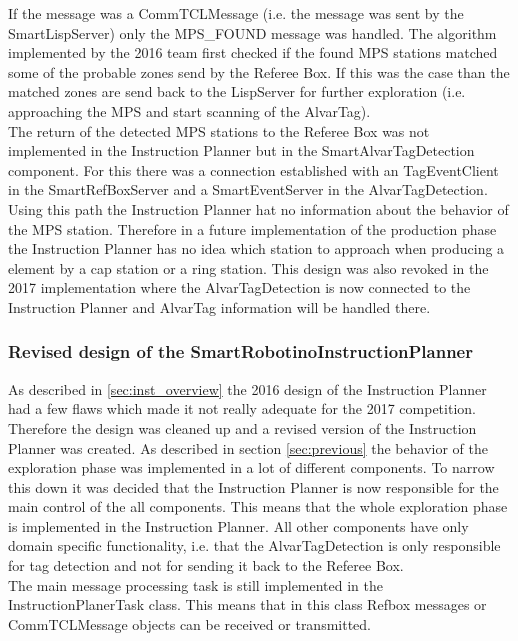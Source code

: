 If the message was a CommTCLMessage (i.e. the message was sent by the SmartLispServer) only the MPS\_FOUND message was handled. The algorithm implemented by the 2016 team first checked if the found MPS stations matched some of the probable zones send by the Referee Box. If this was the case than the matched zones are send back to the LispServer for further exploration (i.e. approaching the MPS and start scanning of the AlvarTag). \\

The return of the detected MPS stations to the Referee Box was not implemented in the Instruction Planner but in the SmartAlvarTagDetection component. For this there was a connection established with an TagEventClient in the SmartRefBoxServer and a SmartEventServer in the AlvarTagDetection. Using this path the Instruction Planner hat no information about the behavior of the MPS station. Therefore in a future implementation of the production phase the Instruction Planner has no idea which station to approach when producing a element by a cap station or a ring station. This design was also revoked in the 2017 implementation where the AlvarTagDetection is now connected to the Instruction Planner and AlvarTag information will be handled there. 
  
 

\subsubsection{Revised design of the SmartRobotinoInstructionPlanner}
\label{sec:new_design}

As described in \ref{sec:inst_overview} the 2016 design of the Instruction Planner had a few flaws which made it not really adequate for the 2017 competition. Therefore the design was cleaned up and a revised version of the Instruction Planner was created. As described in section \ref{sec:previous} the behavior of the exploration phase was implemented in a lot of different components. To narrow this down it was decided that the Instruction Planner is now responsible for the main control of the all components. This means that the whole exploration phase is implemented in the Instruction Planner. All other components have only domain specific functionality, i.e. that the AlvarTagDetection is only responsible for tag detection and not for sending it back to the Referee Box. \\

The main message processing task is still implemented in the InstructionPlanerTask class. This means that in this class Refbox messages or CommTCLMessage objects can be received or transmitted. 


